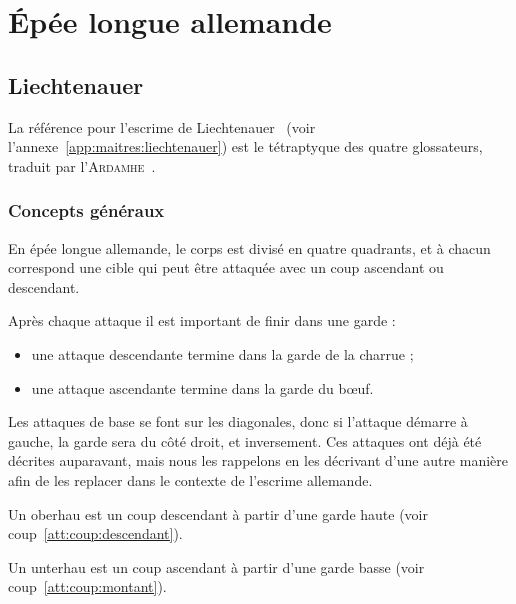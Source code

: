\chapter{Épée longue allemande}


\section{Liechtenauer}
\label{sec:épée-longue:liechtenauer}


La référence pour l'escrime de Liechtenauer~\cite{wiktenauer:liechtenauer} (voir l'annexe~\ref{app:maitres:liechtenauer}) est le tétraptyque des quatre glossateurs, traduit par l'\textsc{Ardamhe}~\cite{ardamhe:tetraptyque}.


\subsection{Concepts généraux}




En épée longue allemande, le corps est divisé en quatre quadrants, et à chacun correspond une cible qui peut être attaquée avec un coup ascendant ou descendant.

Après chaque attaque il est important de finir dans une garde :
\begin{itemize}
	\item une attaque descendante termine dans la garde de la charrue ;
	\item une attaque ascendante termine dans la garde du bœuf.
\end{itemize}
Les attaques de base se font sur les diagonales, donc si l'attaque démarre à gauche, la garde sera du côté droit, et inversement.
Ces attaques ont déjà été décrites auparavant, mais nous les rappelons en les décrivant d'une autre manière afin de les replacer dans le contexte de l'escrime allemande.


\begin{coup}
\label{épée-longue:coup:oberhau}

Un oberhau est un coup descendant à partir d'une garde haute (voir coup~\ref{att:coup:descendant}).

\end{coup}


\begin{coup}
\label{épée-longue:coup:unterhau}

Un unterhau est un coup ascendant à partir d'une garde basse (voir coup~\ref{att:coup:montant}).

\end{coup}


